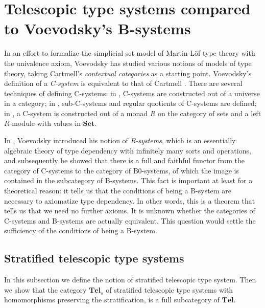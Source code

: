 \section{Telescopic type systems compared to Voevodsky's B-systems}\label{sec:esys_compared}
In an effort to formalize the simplicial set model of Martin-L\"of type theory
with the univalence axiom, Voevodsky has studied various notions of models of
type theory, taking Cartmell's \emph{contextual categories} as a starting
point. Voevodsky's definition of a \emph{C-system} is equivalent to that of Cartmell
\cite{VV_C-systems_quotients}. There are several techniques of defining 
C-systems: in \cite{VV_Csys_univ}, C-systems are constructed out of a universe
in a category; in \cite{VV_C-systems_quotients}, sub-C-systems and regular
quotients of C-systems are defined; in \cite{VV_C-systems_monad}, a C-system
is constructed out of a monad $R$ on the category of sets and a left $R$-module
with values in $\mathbf{Set}$. 

In \cite{VV_B-systems}, Voevodsky introduced his notion of \emph{B-systems}, which is
an essentially algebraic theory of type dependency with infinitely many sorts 
and operations, and subsequently he showed that there is a full and faithful
functor from the category of C-systems to the category of B0-systems, of which
the image is contained in the subcategory of B-systems. This fact is important at least
for a theoretical reason: it tells us that the conditions of being a B-system
are necessary to axiomatize type dependency. In other words,
this is a theorem that tells us that we need no further axioms. It is
unknown whether the categories of C-systems and B-systems are actually equivalent.
This question would settle the sufficiency of the conditions of being a B-system.

\subsection{Stratified telescopic type systems}

In this subsection we define the notion of stratified telescopic type system. Then we show that the category $\mathbf{Tel}_s$ of stratified telescopic type systems with homomorphisms preserving the stratification, is a full subcategory of $\mathbf{Tel}$. 

